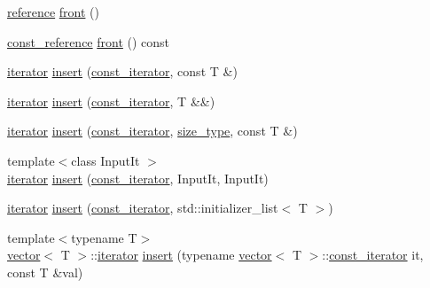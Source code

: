 \begin{DoxyCompactItemize}
\item 
\mbox{\hyperlink{classvector_a9b1a63f171d76a7a3995b6858e99f2ea}{reference}} \mbox{\hyperlink{classvector_ad1bd7e6ac099a63c622f22a3c8777d2b}{front}} ()
\item 
\mbox{\hyperlink{classvector_af9ba3e25df088c62f7d535b91672cda9}{const\+\_\+reference}} \mbox{\hyperlink{classvector_a1d3efc0c1fe3ca55429ac84c5bb8c686}{front}} () const
\item 
\mbox{\hyperlink{classvector_a35c955cacac6aacaa1e82874b1628865}{iterator}} \mbox{\hyperlink{classvector_a0684407ff25ff8fad20580aab801e552}{insert}} (\mbox{\hyperlink{classvector_a2fc97dce62b7053449cc868607540dba}{const\+\_\+iterator}}, const T \&)
\item 
\mbox{\hyperlink{classvector_a35c955cacac6aacaa1e82874b1628865}{iterator}} \mbox{\hyperlink{classvector_a30783a60e25fcd7b9d3d603eb8d2abd3}{insert}} (\mbox{\hyperlink{classvector_a2fc97dce62b7053449cc868607540dba}{const\+\_\+iterator}}, T \&\&)
\item 
\mbox{\hyperlink{classvector_a35c955cacac6aacaa1e82874b1628865}{iterator}} \mbox{\hyperlink{classvector_aa6bfe75030f3a7306f18671bc9e2b4c0}{insert}} (\mbox{\hyperlink{classvector_a2fc97dce62b7053449cc868607540dba}{const\+\_\+iterator}}, \mbox{\hyperlink{classvector_ada51e68d31936547d3729c82daf6b7c6}{size\+\_\+type}}, const T \&)
\item 
{\footnotesize template$<$class Input\+It $>$ }\\\mbox{\hyperlink{classvector_a35c955cacac6aacaa1e82874b1628865}{iterator}} \mbox{\hyperlink{classvector_a602819d5fecd97b2d8c5342e77de7e03}{insert}} (\mbox{\hyperlink{classvector_a2fc97dce62b7053449cc868607540dba}{const\+\_\+iterator}}, Input\+It, Input\+It)
\item 
\mbox{\hyperlink{classvector_a35c955cacac6aacaa1e82874b1628865}{iterator}} \mbox{\hyperlink{classvector_a5e06aa6a068907bcf3ea202a6ae96c1c}{insert}} (\mbox{\hyperlink{classvector_a2fc97dce62b7053449cc868607540dba}{const\+\_\+iterator}}, std\+::initializer\+\_\+list$<$ T $>$)
\item 
{\footnotesize template$<$typename T$>$ }\\\mbox{\hyperlink{classvector}{vector}}$<$ T $>$\+::\mbox{\hyperlink{classvector_a35c955cacac6aacaa1e82874b1628865}{iterator}} \mbox{\hyperlink{classvector_acb9bbf19e97c495d1be39c05e32dd999}{insert}} (typename \mbox{\hyperlink{classvector}{vector}}$<$ T $>$\+::\mbox{\hyperlink{classvector_a2fc97dce62b7053449cc868607540dba}{const\+\_\+iterator}} it, const T \&val)
\item 

\end{DoxyCompactItemize}
